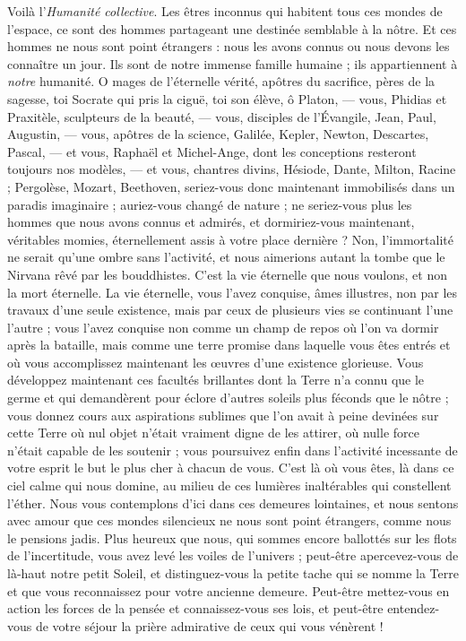 \documentclass[a4paper, 11pt, oneside, landscape]{article}
\begin{document}
Voilà l'\emph{Humanité collective}. Les êtres inconnus qui habitent tous ces mondes de l'espace, ce sont des hommes partageant une destinée semblable à la nôtre. Et ces hommes ne nous sont point étrangers : nous les avons connus ou nous devons les connaître un jour. Ils sont de notre immense famille humaine ; ils appartiennent à \emph{notre} humanité. O mages de l'éternelle vérité, apôtres du sacrifice, pères de la sagesse, toi Socrate qui pris la ciguë, toi son élève, ô Platon, --- vous, Phidias et Praxitèle, sculpteurs de la beauté, --- vous, disciples de l'Évangile, Jean, Paul, Augustin, --- vous, apôtres de la science, Galilée, Kepler, Newton, Descartes, Pascal, --- et vous, Raphaël et Michel-Ange, dont les conceptions resteront toujours nos modèles, --- et vous, chantres divins, Hésiode, Dante, Milton, Racine ; Pergolèse, Mozart, Beethoven, seriez-vous donc maintenant immobilisés dans un paradis imaginaire ; auriez-vous changé de nature ; ne seriez-vous plus les hommes que nous avons connus et admirés, et dormiriez-vous maintenant, véritables momies, éternellement assis à votre place dernière ? Non, l'immortalité ne serait qu'une ombre sans l'activité, et nous aimerions autant la tombe que le Nirvana rêvé par les bouddhistes. C'est la vie éternelle que nous voulons, et non la mort éternelle. La vie éternelle, vous l'avez conquise, âmes illustres, non par les travaux d'une seule existence, mais par ceux de plusieurs vies se continuant l'une l'autre ; vous l'avez conquise non comme un champ de repos où l'on va dormir après la bataille, mais comme une terre promise dans laquelle vous êtes entrés et où vous accomplissez maintenant les œuvres d'une existence glorieuse. Vous développez maintenant ces facultés brillantes dont la Terre n'a connu que le germe et qui demandèrent pour éclore d'autres soleils plus féconds que le nôtre ; vous donnez cours aux aspirations sublimes que l'on avait à peine devinées sur cette Terre où nul objet n'était vraiment digne de les attirer, où nulle force n'était capable de les soutenir ; vous poursuivez enfin dans l'activité incessante de votre esprit le but le plus cher à chacun de vous. C'est là où vous êtes, là dans ce ciel calme qui nous domine, au milieu de ces lumières inaltérables qui constellent l'éther. Nous vous contemplons d'ici dans ces demeures lointaines, et nous sentons avec amour que ces mondes silencieux ne nous sont point étrangers, comme nous le pensions jadis. Plus heureux que nous, qui sommes encore ballottés sur les flots de l'incertitude, vous avez levé les voiles de l'univers ; peut-être apercevez-vous de là-haut notre petit Soleil, et distinguez-vous la petite tache qui se nomme la Terre et que vous reconnaissez pour votre ancienne demeure. Peut-être mettez-vous en action les forces de la pensée et connaissez-vous ses lois, et peut-être entendez-vous de votre séjour la prière admirative de ceux qui vous vénèrent !
\end{document}
